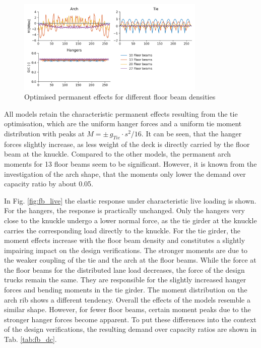 \begin{figure}[H]
    \centering
    \includegraphics[width=0.8\textwidth]{calculations/floor beam comparison/permanent state.png}
    \caption{Optimised permanent effects for different floor beam densities}
    \label{fig:fb_permanent}
\end{figure}

All models retain the characteristic permanent effects resulting from the tie optimisation, which are the uniform hanger forces and a uniform tie moment distribution with peaks at $M=\pm\,g_{Tie} \cdot s^2 / 16$. It can be seen, that the hanger forces slightly increase, as less weight of the deck is directly carried by the floor beam at the knuckle. Compared to the other models, the permanent arch moments for 13 floor beams seem to be significant. However, it is known from the investigation of the arch shape, that the moments only lower the demand over capacity ratio by about 0.05. \medskip

In Fig. \ref{fig:fb_live} the elastic response under characteristic live loading is shown. For the hangers, the response is practically unchanged. Only the hangers very close to the knuckle undergo a lower normal force, as the tie girder at the knuckle carries the corresponding load directly to the knuckle. For the tie girder, the moment effects increase with the floor beam density and constitutes a slightly impairing impact on the design verifications. The stronger moments are due to the weaker coupling of the tie and the arch at the floor beams. While the force at the floor beams for the distributed lane load decreases, the force of the design trucks remain the same. They are responsible for the slightly increased hanger forces and bending moments in the tie girder. The moment distribution on the arch rib shows a different tendency. Overall the effects of the models resemble a similar shape. However, for fewer floor beams, certain moment peaks due to the stronger hanger forces become apparent. To put these differences into the context of the design verifications, the resulting demand over capacity ratios are shown in Tab. \ref{tab:fb_dc}.

